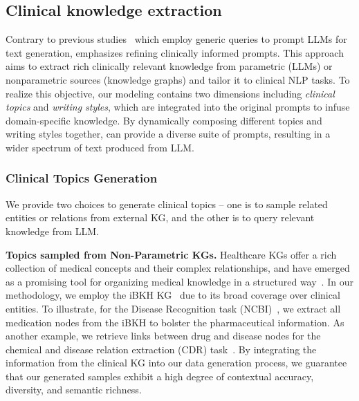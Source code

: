 \subsection{Clinical knowledge extraction}
Contrary to previous studies~\citep{ye2022zerogen,ye2022progen,meng2022generating,meng2023tuning} which employ generic queries to prompt LLMs for text generation, {\ours} emphasizes refining clinically informed prompts. This approach aims to extract rich clinically relevant knowledge from parametric (\eg LLMs) or nonparametric sources (\eg knowledge graphs) and tailor it to clinical NLP tasks.
To realize this objective, our modeling contains two dimensions including \emph{clinical topics} and \emph{writing styles}, which are integrated into the original prompts to infuse domain-specific knowledge. 
By dynamically composing different topics and writing styles together, {\ours} can provide a diverse suite of prompts, resulting in a wider spectrum of text produced from LLM.



\subsubsection{Clinical Topics Generation}
We provide two choices to generate clinical topics -- one is to sample related entities or relations from external KG, and the other is to query relevant knowledge from LLM.

\textbf{Topics sampled from Non-Parametric KGs.} 
Healthcare KGs offer 
a rich collection of medical concepts and their complex relationships, and have emerged as a promising tool for organizing medical knowledge in a structured way~\citep{li2022graph,cui2023survey}. 
In our methodology, we employ the iBKH KG~\citep{su2023biomedical} due to its broad coverage over clinical entities. 
To illustrate, for the Disease Recognition task (NCBI)~\citep{ncbi-disease}, we extract all medication nodes from the iBKH to bolster the pharmaceutical information. 
As another example, we retrieve links between drug and disease nodes for the chemical and disease relation extraction (CDR) task~\citep{cdr_dataset}. 
By integrating the information from the clinical KG into our data generation process, we guarantee that our generated samples exhibit a high degree of contextual accuracy, diversity, and semantic richness.


